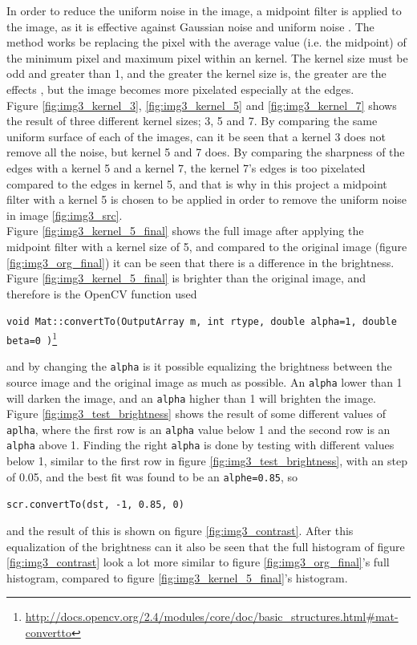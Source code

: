 In order to reduce the uniform noise in the image, a midpoint filter is applied to the image, as it is effective against Gaussian noise and uniform noise . The method works be replacing the pixel with the average value (i.e. the midpoint) of the minimum pixel and maximum pixel within an kernel.  The kernel size must be odd and greater than 1, and the greater the kernel size is, the greater are the effects , but the image becomes more pixelated especially at the edges.  \\[0.2cm]
Figure \ref{fig:img3_kernel_3}, \ref{fig:img3_kernel_5} and \ref{fig:img3_kernel_7} shows the result of three different kernel sizes; 3, 5 and 7. By comparing the same uniform surface of each of the images, can it be seen that a kernel 3 does not remove all the noise, but kernel 5 and 7 does. By comparing the sharpness of the edges with a kernel 5 and a kernel 7, the kernel 7's edges is too pixelated compared to the edges in kernel 5, and that is why in this project a midpoint filter with a kernel 5 is chosen to be applied in order to remove the uniform noise in image \ref{fig:img3_src}.\\[0.2cm]
Figure \ref{fig:img3_kernel_5_final} shows the full image after applying the midpoint filter with a kernel size of 5, and compared to the original image (figure \ref{fig:img3_org_final}) it can be seen that there is a difference in the brightness. Figure \ref{fig:img3_kernel_5_final} is brighter than the original image, and therefore is the OpenCV function used
\begin{center}
\lstinline|void Mat::convertTo(OutputArray m, int rtype, double alpha=1, double beta=0 )|\footnote{\url{http://docs.opencv.org/2.4/modules/core/doc/basic_structures.html\#mat-convertto}}
\end{center}
and by changing the \lstinline|alpha| is it possible equalizing the brightness between the source image and the original image as much as possible. An \lstinline|alpha| lower than 1 will darken the image, and an \lstinline|alpha| higher than 1 will brighten the image. Figure \ref{fig:img3_test_brightness} shows the result of some different values of \lstinline|aplha|, where the first row is an \lstinline|alpha| value below 1 and the second row is an \lstinline|alpha| above 1. Finding the right \lstinline|alpha| is done by testing with different values below 1, similar to the first row in figure \ref{fig:img3_test_brightness}, with an step of 0.05, and the best fit was found to be an \lstinline|alphe=0.85|, so 
\begin{center}
\lstinline|scr.convertTo(dst, -1, 0.85, 0)|
\end{center}
and the result of this is shown on figure \ref{fig:img3_contrast}. After this equalization  of the brightness can it also be seen that the full histogram of figure \ref{fig:img3_contrast} look a lot more similar to figure \ref{fig:img3_org_final}'s full histogram, compared to figure \ref{fig:img3_kernel_5_final}'s histogram.

